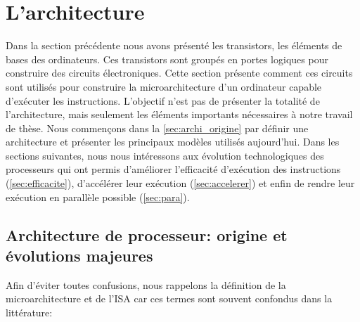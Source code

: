 \section{L'architecture} \label{sec:micro}

Dans la section précédente nous avons présenté les transistors, les éléments de bases des ordinateurs. Ces transistors sont groupés en portes logiques pour construire des circuits électroniques. Cette section présente comment ces circuits sont utilisés pour construire la microarchitecture d'un ordinateur capable d'exécuter les instructions. L'objectif n'est pas de présenter la totalité de l'architecture, mais seulement les éléments importants nécessaires à notre travail de thèse. Nous commençons dans la \autoref{sec:archi_origine} par définir une architecture et présenter les principaux modèles utilisés aujourd'hui. Dans les sections suivantes, nous nous intéressons aux évolution technologiques des processeurs qui ont permis d'améliorer l'efficacité d'exécution des instructions (\autoref{sec:efficacite}), d'accélérer leur exécution (\autoref{sec:accelerer}) et enfin de rendre leur exécution en parallèle possible (\autoref{sec:para}).



\subsection{Architecture de processeur: origine et évolutions majeures} \label{sec:archi_origine}

    
Afin d'éviter toutes confusions, nous rappelons la définition de la microarchitecture et de l'ISA car ces termes sont souvent confondus dans la littérature:

